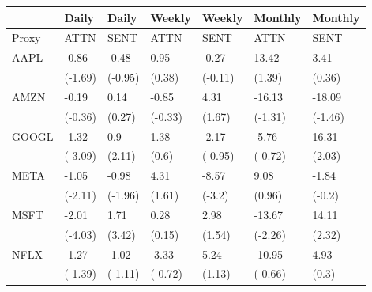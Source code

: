 \begin{tabular}{lllllll}
\toprule
{} &    Daily &    Daily &   Weekly &   Weekly &  Monthly &  Monthly \\
\midrule
Proxy &     ATTN &     SENT &     ATTN &     SENT &     ATTN &     SENT \\
AAPL  &    -0.86 &    -0.48 &     0.95 &    -0.27 &    13.42 &     3.41 \\
      &  (-1.69) &  (-0.95) &   (0.38) &  (-0.11) &   (1.39) &   (0.36) \\
AMZN  &    -0.19 &     0.14 &    -0.85 &     4.31 &   -16.13 &   -18.09 \\
      &  (-0.36) &   (0.27) &  (-0.33) &   (1.67) &  (-1.31) &  (-1.46) \\
GOOGL &    -1.32 &      0.9 &     1.38 &    -2.17 &    -5.76 &    16.31 \\
      &  (-3.09) &   (2.11) &    (0.6) &  (-0.95) &  (-0.72) &   (2.03) \\
META  &    -1.05 &    -0.98 &     4.31 &    -8.57 &     9.08 &    -1.84 \\
      &  (-2.11) &  (-1.96) &   (1.61) &   (-3.2) &   (0.96) &   (-0.2) \\
MSFT  &    -2.01 &     1.71 &     0.28 &     2.98 &   -13.67 &    14.11 \\
      &  (-4.03) &   (3.42) &   (0.15) &   (1.54) &  (-2.26) &   (2.32) \\
NFLX  &    -1.27 &    -1.02 &    -3.33 &     5.24 &   -10.95 &     4.93 \\
      &  (-1.39) &  (-1.11) &  (-0.72) &   (1.13) &  (-0.66) &    (0.3) \\
\bottomrule
\end{tabular}

